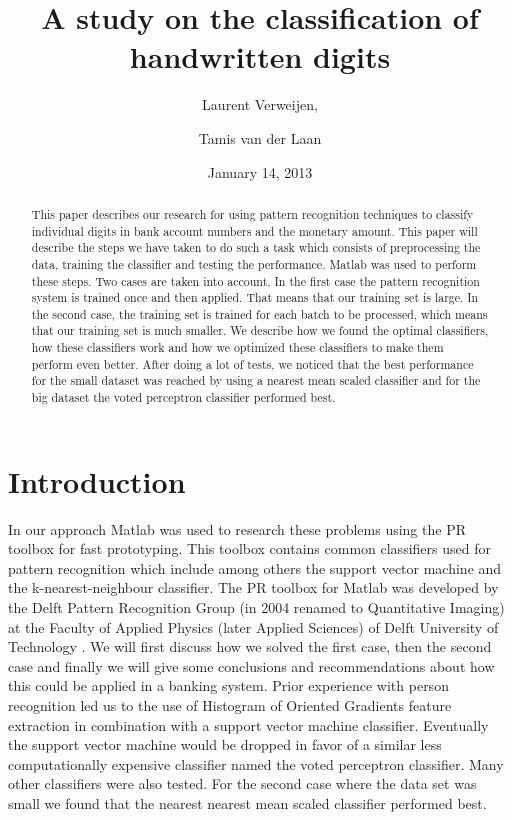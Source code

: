 \documentclass[%
        compressed,
        final,
        notitlepage,
        narroweqnarray,
        inline,
        twoside,
        ]{ieee}
\title{A study on the classification of handwritten digits}
\author{Laurent Verweijen, \and Tamis van der Laan}
\date{January 14, 2013}
\begin{document}
\maketitle

\begin{abstract}
This paper describes our research for using pattern recognition techniques to
classify individual digits in bank account numbers and the monetary amount. This
paper will describe the steps we have taken to do such a task which consists of
preprocessing the data, training the classifier and testing the performance.
Matlab was used to perform these steps. Two cases are taken into account. In the
first case the pattern recognition system is trained once and then applied.
That means that our training set is large. In the second case, the training set
is trained for each batch to be processed, which means that our training set is
much smaller. We describe how we found the optimal classifiers, how these
classifiers work and how we optimized these classifiers to make them perform
even better. After doing a lot of tests, we noticed that the best performance
for the small dataset was reached by using a nearest mean scaled classifier and
for the big dataset the voted perceptron classifier performed best. 
\end{abstract}

\section{Introduction}
In our approach Matlab was used to research these problems using the PR toolbox
for fast prototyping. 
This toolbox contains common classifiers used for pattern recognition which
include among others the support vector machine and the k-nearest-neighbour
classifier. 
The PR toolbox for Matlab was developed by the Delft Pattern Recognition Group
(in 2004 renamed to Quantitative Imaging) at the Faculty of Applied Physics
(later Applied Sciences) of Delft University of Technology \cite{Ferdi}.
We will first
discuss how we solved the first case, then the second case and finally we will
give some conclusions and recommendations about how this could be applied in a
banking system. Prior experience with person recognition \cite{Tamis} led us to
the use of Histogram of Oriented Gradients feature
extraction in combination with a support vector machine classifier. Eventually
the support vector machine would be dropped in favor of a similar less
computationally expensive classifier named the voted perceptron classifier. Many
other classifiers were also tested. For the second case where the data set was
small we found that the nearest nearest mean scaled classifier performed best.
\end{document}
